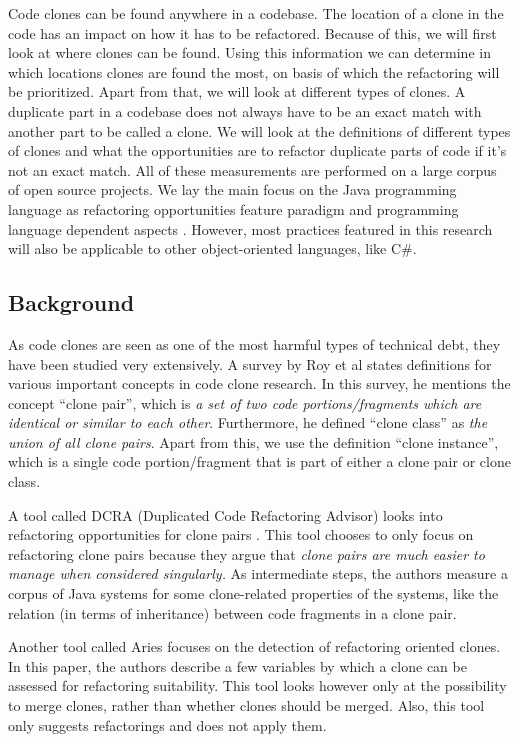 \documentclass[a4paper]{article}
\begin{document}
Code clones can be found anywhere in a codebase. The location of a clone in the code has an impact on how it has to be refactored. Because of this, we will first look at where clones can be found. Using this information we can determine in which locations clones are found the most, on basis of which the refactoring will be prioritized. Apart from that, we will look at different types of clones. A duplicate part in a codebase does not always have to be an exact match with another part to be called a clone. We will look at the definitions of different types of clones and what the opportunities are to refactor duplicate parts of code if it's not an exact match. All of these measurements are performed on a large corpus of open source projects. We lay the main focus on the Java programming language as refactoring opportunities feature paradigm and programming language dependent aspects \cite{choi2011extracting}. However, most practices featured in this research will also be applicable to other object-oriented languages, like C\#.

\subsection{Background}
As code clones are seen as one of the most harmful types of technical debt, they have been studied very extensively. A survey by Roy et al \cite{roy2007survey} states definitions for various important concepts in code clone research. In this survey, he mentions the concept ``clone pair'', which is \textit{a set of two code portions/fragments which are identical or similar to each other}. Furthermore, he defined ``clone class'' as \textit{the union of all clone pairs}. Apart from this, we use the definition ``clone instance'', which is a single code portion/fragment that is part of either a clone pair or clone class.

A tool called DCRA (Duplicated Code Refactoring Advisor) looks into refactoring opportunities for clone pairs \cite{fontana2012duplicated}. This tool chooses to only focus on refactoring clone pairs because they argue that \textit{clone pairs are much easier to manage when considered singularly.} As intermediate steps, the authors measure a corpus of Java systems for some clone-related properties of the systems, like the relation (in terms of inheritance) between code fragments in a clone pair.

Another tool called Aries \cite{higo2004aries, higo2008metric} focuses on the detection of refactoring oriented clones. In this paper, the authors describe a few variables by which a clone can be assessed for refactoring suitability. This tool looks however only at the possibility to merge clones, rather than whether clones should be merged. Also, this tool only suggests refactorings and does not apply them.
\end{document}
